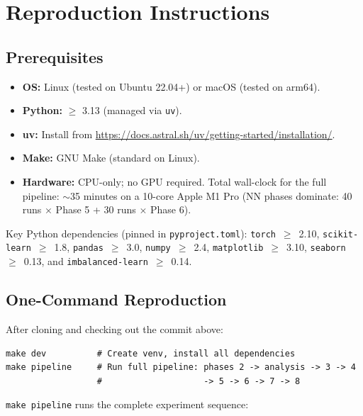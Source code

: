 \documentclass[letterpaper, 11pt]{article}
\begin{document}
\section{Reproduction Instructions}

\subsection{Prerequisites}

\begin{itemize}
\item \textbf{OS:} Linux (tested on Ubuntu 22.04+) or macOS (tested on arm64).
\item \textbf{Python:} $\geq$ 3.13 (managed via \texttt{uv}).
\item \textbf{uv:} Install from \url{https://docs.astral.sh/uv/getting-started/installation/}.
\item \textbf{Make:} GNU Make (standard on Linux).
\item \textbf{Hardware:} CPU-only; no GPU required. Total wall-clock for the full pipeline: $\sim$35 minutes on a 10-core Apple M1 Pro (NN phases dominate: 40 runs $\times$ Phase 5 + 30 runs $\times$ Phase 6).
\end{itemize}

Key Python dependencies (pinned in \texttt{pyproject.toml}):
\texttt{torch}~$\geq$~2.10,
\texttt{scikit-learn}~$\geq$~1.8,
\texttt{pandas}~$\geq$~3.0,
\texttt{numpy}~$\geq$~2.4,
\texttt{matplotlib}~$\geq$~3.10,
\texttt{seaborn}~$\geq$~0.13,
and \texttt{imbalanced-learn}~$\geq$~0.14.

\subsection{One-Command Reproduction}

After cloning and checking out the commit above:

\begin{verbatim}
make dev          # Create venv, install all dependencies
make pipeline     # Run full pipeline: phases 2 -> analysis -> 3 -> 4
                  #                    -> 5 -> 6 -> 7 -> 8
\end{verbatim}

\texttt{make pipeline} runs the complete experiment sequence:
\end{document}
